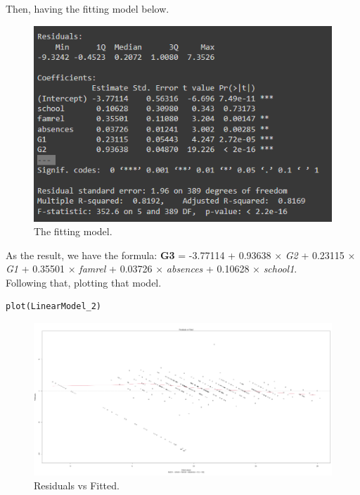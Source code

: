 \documentclass[a4paper]{article}
\begin{document}
Then, having the fitting model below.
\begin{figure}[H]
    \centering
    \includegraphics[scale = 1.3]{Images/49.PNG}
    \caption{The fitting model.}
    \label{fig:linear7}
\end{figure}
As the result, we have the formula: \hspace{0.5cm} \textbf{G3} = -3.77114 + 0.93638 × \textit{G2} + 0.23115 × \textit{G1} + 0.35501 × \textit{famrel} + 0.03726 × \textit{absences} + 0.10628 × \textit{school1}. \\ \newline \newline
Following that, plotting that model.
\begin{mdframed}[leftline=false,rightline=false,backgroundcolor=magenta!10,nobreak=true]
    \begin{verbatim}
plot(LinearModel_2)
    \end{verbatim}
\end{mdframed}
\begin{figure}[H]
    \centering
    \includegraphics[width = 1.1\linewidth]{Images/50.PNG}
    \caption{Residuals vs Fitted.}
    \label{fig:linear8}
\end{figure}
\end{document}
